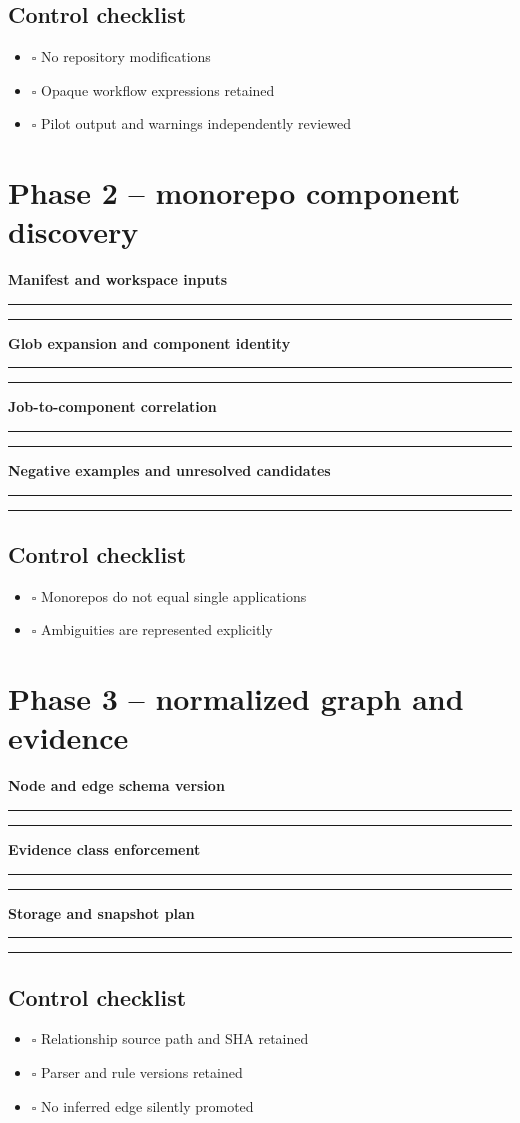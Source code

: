 \documentclass[11pt,letterpaper]{article}
\newcommand{\Field}[2]{\par\noindent\textbf{#1}\par\vspace{1em}\noindent\rule{0.96\linewidth}{0.4pt}\par\vspace{1.0em}\noindent\rule{0.96\linewidth}{0.4pt}\par\vspace{1em}}
\begin{document}
\subsection{Control checklist}
\begin{itemize}
\item $\square$ No repository modifications
\item $\square$ Opaque workflow expressions retained
\item $\square$ Pilot output and warnings independently reviewed
\end{itemize}


\section{Phase 2 -- monorepo component discovery}
\Field{Manifest and workspace inputs}{Enumerate Maven, Gradle, npm/pnpm, Python, Go, Rust and container build clues.}
\Field{Glob expansion and component identity}{Document pinned tree resolution, excludes, collisions and durable identities.}
\Field{Job-to-component correlation}{Separate explicit build target evidence from broad path-filter inferences.}
\Field{Negative examples and unresolved candidates}{Note nested checkout, dynamic scripts, library-only packages and denied trees.}
\subsection{Control checklist}
\begin{itemize}
\item $\square$ Monorepos do not equal single applications
\item $\square$ Ambiguities are represented explicitly
\end{itemize}


\section{Phase 3 -- normalized graph and evidence}
\Field{Node and edge schema version}{Enumerate required entities, relationship types, stable IDs and provenance.}
\Field{Evidence class enforcement}{Require E1 observed, E2 inferred, E3 externally verified with promotion evidence.}
\Field{Storage and snapshot plan}{Specify schema migrations, repeatable imports, query model and history.}
\subsection{Control checklist}
\begin{itemize}
\item $\square$ Relationship source path and SHA retained
\item $\square$ Parser and rule versions retained
\item $\square$ No inferred edge silently promoted
\end{itemize}
\end{document}
